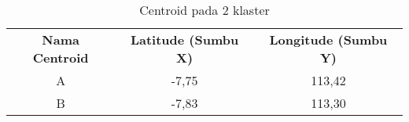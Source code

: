 \begin{table}[H]
\footnotesize
\centering
\begin{tabular}{ccc}
\rowcolor[HTML]{4472C4} 
{\color[HTML]{FFFFFF} \textbf{Nama   Centroid}} & {\color[HTML]{FFFFFF} \textbf{Latitude (Sumbu X)}} & {\color[HTML]{FFFFFF} \textbf{Longitude (Sumbu Y)}} \\
\rowcolor[HTML]{D9E1F2} 
A                                               & -7,75                                              & 113,42                                              \\
B                                               & -7,83                                              & 113,30                                             
\end{tabular}
\caption{Centroid pada 2 klaster}
\label{tab:center2}
\end{table}